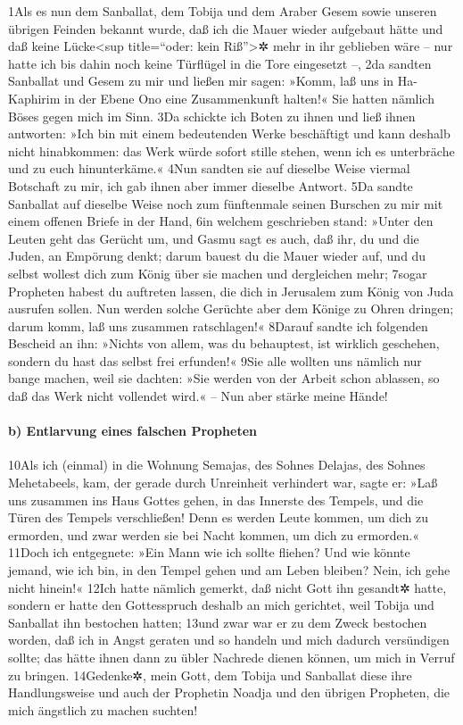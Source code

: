 1Als es nun dem Sanballat, dem Tobija und dem Araber Gesem sowie unseren
übrigen Feinden bekannt wurde, daß ich die Mauer wieder aufgebaut hätte
und daß keine Lücke\textless sup title=``oder: kein Riß''\textgreater✲
mehr in ihr geblieben wäre -- nur hatte ich bis dahin noch keine
Türflügel in die Tore eingesetzt --, 2da sandten Sanballat und Gesem zu
mir und ließen mir sagen: »Komm, laß uns in Ha-Kaphirim in der Ebene Ono
eine Zusammenkunft halten!« Sie hatten nämlich Böses gegen mich im Sinn.
3Da schickte ich Boten zu ihnen und ließ ihnen antworten: »Ich bin mit
einem bedeutenden Werke beschäftigt und kann deshalb nicht hinabkommen:
das Werk würde sofort stille stehen, wenn ich es unterbräche und zu euch
hinunterkäme.« 4Nun sandten sie auf dieselbe Weise viermal Botschaft zu
mir, ich gab ihnen aber immer dieselbe Antwort. 5Da sandte Sanballat auf
dieselbe Weise noch zum fünftenmale seinen Burschen zu mir mit einem
offenen Briefe in der Hand, 6in welchem geschrieben stand: »Unter den
Leuten geht das Gerücht um, und Gasmu sagt es auch, daß ihr, du und die
Juden, an Empörung denkt; darum bauest du die Mauer wieder auf, und du
selbst wollest dich zum König über sie machen und dergleichen mehr;
7sogar Propheten habest du auftreten lassen, die dich in Jerusalem zum
König von Juda ausrufen sollen. Nun werden solche Gerüchte aber dem
Könige zu Ohren dringen; darum komm, laß uns zusammen ratschlagen!«
8Darauf sandte ich folgenden Bescheid an ihn: »Nichts von allem, was du
behauptest, ist wirklich geschehen, sondern du hast das selbst frei
erfunden!« 9Sie alle wollten uns nämlich nur bange machen, weil sie
dachten: »Sie werden von der Arbeit schon ablassen, so daß das Werk
nicht vollendet wird.« -- Nun aber stärke meine Hände!

\hypertarget{b-entlarvung-eines-falschen-propheten}{%
\paragraph{b) Entlarvung eines falschen
Propheten}\label{b-entlarvung-eines-falschen-propheten}}

10Als ich (einmal) in die Wohnung Semajas, des Sohnes Delajas, des
Sohnes Mehetabeels, kam, der gerade durch Unreinheit verhindert war,
sagte er: »Laß uns zusammen ins Haus Gottes gehen, in das Innerste des
Tempels, und die Türen des Tempels verschließen! Denn es werden Leute
kommen, um dich zu ermorden, und zwar werden sie bei Nacht kommen, um
dich zu ermorden.« 11Doch ich entgegnete: »Ein Mann wie ich sollte
fliehen? Und wie könnte jemand, wie ich bin, in den Tempel gehen und am
Leben bleiben? Nein, ich gehe nicht hinein!« 12Ich hatte nämlich
gemerkt, daß nicht Gott ihn gesandt✲ hatte, sondern er hatte den
Gottesspruch deshalb an mich gerichtet, weil Tobija und Sanballat ihn
bestochen hatten; 13und zwar war er zu dem Zweck bestochen worden, daß
ich in Angst geraten und so handeln und mich dadurch versündigen sollte;
das hätte ihnen dann zu übler Nachrede dienen können, um mich in Verruf
zu bringen. 14Gedenke✲, mein Gott, dem Tobija und Sanballat diese ihre
Handlungsweise und auch der Prophetin Noadja und den übrigen Propheten,
die mich ängstlich zu machen suchten!

